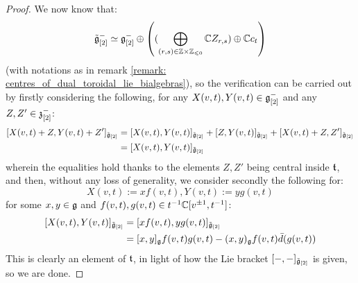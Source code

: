                 \begin{proof}
                    We now know that:
                        $$\tilde{\g}_{[2]}^- \cong \g_{[2]}^- \oplus \left( ( \bigoplus_{(r, s) \in \Z \x \Z_{\leq 0}} \bbC Z_{r, s}) \oplus \bbC c_t \right)$$
                    (with notations as in remark \ref{remark: centres_of_dual_toroidal_lie_bialgebras}), so the verification can be carried out by firstly considering the following, for any $X(v, t), Y(v, t) \in \mathfrak{g}_{[2]}^-$ and any $Z, Z' \in \mathfrak{z}_{[2]}^-$:
                        $$
                            \begin{aligned}
                                [ X(v, t) + Z, Y(v, t) + Z' ]_{\tilde{\g}_{[2]}} & = [ X(v, t), Y(v, t) ]_{\tilde{\g}_{[2]}} + [ Z, Y(v, t) ]_{\tilde{\g}_{[2]}} + [X(v, t) + Z, Z']_{\tilde{\g}_{[2]}}
                                \\
                                & = [ X(v, t), Y(v, t) ]_{\tilde{\g}_{[2]}}
                            \end{aligned}
                        $$
                    wherein the equalities hold thanks to the elements $Z, Z'$ being central inside $\mathfrak{t}$, and then, without any loss of generality, we consider secondly the following for:
                        $$X(v, t) := x f(v, t), Y(v, t) := y g(v, t)$$
                    for some $x, y \in \mathfrak{g}$ and $f(v, t), g(v, t) \in t^{-1}\mathbb{C}[v^{\pm 1}, t^{-1}]$:
                        $$
                            \begin{aligned}
                                [ X(v, t), Y(v, t) ]_{\tilde{\g}_{[2]}} & = [ x f(v, t), y g(v, t) ]_{\tilde{\g}_{[2]}}
                                \\
                                & = [x, y]_{\g} f(v, t) g(v, t) - (x, y)_{\g} f(v, t) \bar{d}( g(v, t) )
                            \end{aligned}
                        $$
                    This is clearly an element of $\mathfrak{t}$, in light of how the Lie bracket $[-, -]_{\tilde{\mathfrak{g}}_{[2]}}$ is given, so we are done. 
                \end{proof}

